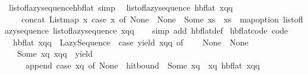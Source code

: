 \begin{isabellebody}
\isanewline
{}\isamarkupfalse%
\ list{\isacharunderscore}{\kern0pt}of{\isacharunderscore}{\kern0pt}lazy{\isacharunderscore}{\kern0pt}sequence{\isacharunderscore}{\kern0pt}hb{\isacharunderscore}{\kern0pt}flat\ {\isacharbrackleft}{\kern0pt}simp{\isacharbrackright}{\kern0pt}{\isacharcolon}{\kern0pt}\isanewline
\ \ {\isachardoublequoteopen}list{\isacharunderscore}{\kern0pt}of{\isacharunderscore}{\kern0pt}lazy{\isacharunderscore}{\kern0pt}sequence\ {\isacharparenleft}{\kern0pt}hb{\isacharunderscore}{\kern0pt}flat\ xqq{\isacharparenright}{\kern0pt}\ {\isacharequal}{\kern0pt}\isanewline
\ \ \ \ concat\ {\isacharparenleft}{\kern0pt}List{\isachardot}{\kern0pt}map\ {\isacharparenleft}{\kern0pt}{\isacharparenleft}{\kern0pt}{\isasymlambda}x{\isachardot}{\kern0pt}\ case\ x\ of\ None\ {\isasymRightarrow}\ {\isacharbrackleft}{\kern0pt}None{\isacharbrackright}{\kern0pt}\ {\isacharbar}{\kern0pt}\ Some\ xs\ {\isasymRightarrow}\ xs{\isacharparenright}{\kern0pt}\ {\isasymcirc}\ map{\isacharunderscore}{\kern0pt}option\ list{\isacharunderscore}{\kern0pt}of{\isacharunderscore}{\kern0pt}lazy{\isacharunderscore}{\kern0pt}sequence{\isacharparenright}{\kern0pt}\ {\isacharparenleft}{\kern0pt}list{\isacharunderscore}{\kern0pt}of{\isacharunderscore}{\kern0pt}lazy{\isacharunderscore}{\kern0pt}sequence\ xqq{\isacharparenright}{\kern0pt}{\isacharparenright}{\kern0pt}{\isachardoublequoteclose}\isanewline
%
\isadelimproof
\ \ %
\endisadelimproof
%
\isatagproof
{}\isamarkupfalse%
\ {\isacharparenleft}{\kern0pt}simp\ add{\isacharcolon}{\kern0pt}\ hb{\isacharunderscore}{\kern0pt}flat{\isacharunderscore}{\kern0pt}def{\isacharparenright}{\kern0pt}%
\endisatagproof
{\isafoldproof}%
%
\isadelimproof
\isanewline
%
\endisadelimproof
\isanewline
{}\isamarkupfalse%
\ hb{\isacharunderscore}{\kern0pt}flat{\isacharunderscore}{\kern0pt}code\ {\isacharbrackleft}{\kern0pt}code{\isacharbrackright}{\kern0pt}{\isacharcolon}{\kern0pt}\isanewline
\ \ {\isachardoublequoteopen}hb{\isacharunderscore}{\kern0pt}flat\ xqq\ {\isacharequal}{\kern0pt}\ Lazy{\isacharunderscore}{\kern0pt}Sequence\ {\isacharparenleft}{\kern0pt}{\isasymlambda}{\isacharunderscore}{\kern0pt}{\isachardot}{\kern0pt}\ case\ yield\ xqq\ of\isanewline
\ \ \ \ None\ {\isasymRightarrow}\ None\isanewline
\ \ {\isacharbar}{\kern0pt}\ Some\ {\isacharparenleft}{\kern0pt}xq{\isacharcomma}{\kern0pt}\ xqq{\isacharprime}{\kern0pt}{\isacharparenright}{\kern0pt}\ {\isasymRightarrow}\ yield\isanewline
\ \ \ \ \ {\isacharparenleft}{\kern0pt}append\ {\isacharparenleft}{\kern0pt}case\ xq\ of\ None\ {\isasymRightarrow}\ hit{\isacharunderscore}{\kern0pt}bound\ {\isacharbar}{\kern0pt}\ Some\ xq\ {\isasymRightarrow}\ xq{\isacharparenright}{\kern0pt}\ {\isacharparenleft}{\kern0pt}hb{\isacharunderscore}{\kern0pt}flat\ xqq{\isacharprime}{\kern0pt}{\isacharparenright}{\kern0pt}{\isacharparenright}{\kern0pt}{\isacharparenright}{\kern0pt}{\isachardoublequoteclose}\isanewline

\end{isabellebody}
